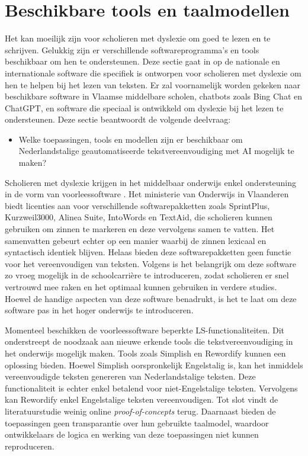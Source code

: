\section{Beschikbare tools en taalmodellen}
\label{sec:beschikbare-tools-en-taalmodellen}

Het kan moeilijk zijn voor scholieren met dyslexie om goed te lezen en te schrijven. Gelukkig zijn er verschillende softwareprogramma's en tools beschikbaar om hen te ondersteunen. Deze sectie gaat in op de nationale en internationale software die specifiek is ontworpen voor scholieren met dyslexie om hen te helpen bij het lezen van teksten.  Er zal voornamelijk worden gekeken naar beschikbare software in Vlaamse middelbare scholen, chatbots zoals Bing Chat en ChatGPT, en software die speciaal is ontwikkeld om dyslexie bij het lezen te ondersteunen. Deze sectie beantwoordt de volgende deelvraag: 

\begin{itemize}
	\item Welke toepassingen, tools en modellen zijn er beschikbaar om Nederlandstalige geautomatiseerde tekstvereenvoudiging met AI mogelijk te maken?
\end{itemize}

Scholieren met dyslexie krijgen in het middelbaar onderwijs enkel ondersteuning in de vorm van voorleessoftware \autocite{DeCraemer2018, OnderwijsVlaanderen2023}. Het ministerie van Onderwijs in Vlaanderen biedt licenties aan voor verschillende softwarepakketten zoals SprintPlus, Kurzweil3000, Alinea Suite, IntoWords en TextAid, die scholieren kunnen gebruiken om zinnen te markeren en deze vervolgens samen te vatten. Het samenvatten gebeurt echter op een manier waarbij de zinnen lexicaal en syntactisch identiek blijven. Helaas bieden deze softwarepakketten geen functie voor het vereenvoudigen van teksten. Volgens \textcite{Tops2018} is het belangrijk om deze software zo vroeg mogelijk in de schoolcarrière te introduceren, zodat scholieren er snel vertrouwd mee raken en het optimaal kunnen gebruiken in verdere studies. Hoewel \textcite{Tops2018} de handige aspecten van deze software benadrukt, is het te laat om deze software pas in het hoger onderwijs te introduceren.

\medspace

Momenteel beschikken de voorleessoftware beperkte LS-functionaliteiten. Dit onderstreept de noodzaak aan nieuwe erkende tools die tekstvereenvoudiging in het onderwijs mogelijk maken. Tools zoals Simplish en Rewordify kunnen een oplossing bieden. Hoewel Simplish oorspronkelijk Engelstalig is, kan het inmiddels vereenvoudigde teksten genereren van Nederlandstalige teksten. Deze functionaliteit is echter enkel betalend voor niet-Engelstalige teksten. Vervolgens kan Rewordify enkel Engelstalige teksten vereenvoudigen. Tot slot vindt de literatuurstudie weinig online \textit{proof-of-concepts} terug. Daarnaast bieden de toepassingen geen transparantie over hun gebruikte taalmodel, waardoor ontwikkelaars de logica en werking van deze toepassingen niet kunnen reproduceren. 

